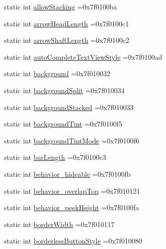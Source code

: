 \begin{DoxyCompactItemize}
\item 
static int \hyperlink{classandroid_1_1support_1_1v4_1_1R_1_1attr_ab166be6b5606db68828a302f162f8cd0}{allow\+Stacking} =0x7f0100ba
\item 
static int \hyperlink{classandroid_1_1support_1_1v4_1_1R_1_1attr_a2e623c2b4980c56bac06c3ec52a679e5}{arrow\+Head\+Length} =0x7f0100c1
\item 
static int \hyperlink{classandroid_1_1support_1_1v4_1_1R_1_1attr_a5b8710bfc0b35653f4f7cc097e377dfc}{arrow\+Shaft\+Length} =0x7f0100c2
\item 
static int \hyperlink{classandroid_1_1support_1_1v4_1_1R_1_1attr_a1431731a557fac44d41907daa49e4b8f}{auto\+Complete\+Text\+View\+Style} =0x7f0100ad
\item 
static int \hyperlink{classandroid_1_1support_1_1v4_1_1R_1_1attr_a3aa8b955b1ba13d9d418c7ac9c23b291}{background} =0x7f010032
\item 
static int \hyperlink{classandroid_1_1support_1_1v4_1_1R_1_1attr_accf7c5a5b1116cb065de3d8e2451c213}{background\+Split} =0x7f010034
\item 
static int \hyperlink{classandroid_1_1support_1_1v4_1_1R_1_1attr_af2fc746740dad6cfe275c2ff161399a6}{background\+Stacked} =0x7f010033
\item 
static int \hyperlink{classandroid_1_1support_1_1v4_1_1R_1_1attr_aee5568276e5effa7f9682abb574dbb69}{background\+Tint} =0x7f0100f5
\item 
static int \hyperlink{classandroid_1_1support_1_1v4_1_1R_1_1attr_a7169568146e422cf98009d4a36ee607c}{background\+Tint\+Mode} =0x7f0100f6
\item 
static int \hyperlink{classandroid_1_1support_1_1v4_1_1R_1_1attr_ad58969d24cd9bf6a2af3fdd44ca43dbf}{bar\+Length} =0x7f0100c3
\item 
static int \hyperlink{classandroid_1_1support_1_1v4_1_1R_1_1attr_a4743a5bd4c43bcfe955c9904fe16c93e}{behavior\+\_\+hideable} =0x7f0100fb
\item 
static int \hyperlink{classandroid_1_1support_1_1v4_1_1R_1_1attr_a9c99f83bd4153ed9af5740d4a4cf48dc}{behavior\+\_\+overlap\+Top} =0x7f010121
\item 
static int \hyperlink{classandroid_1_1support_1_1v4_1_1R_1_1attr_a410f0e475e0b8e5e57b221d907504857}{behavior\+\_\+peek\+Height} =0x7f0100fa
\item 
static int \hyperlink{classandroid_1_1support_1_1v4_1_1R_1_1attr_a05efc50b5af682c842a413b753b38a20}{border\+Width} =0x7f010117
\item 
static int \hyperlink{classandroid_1_1support_1_1v4_1_1R_1_1attr_a08415738186ce4d57592c16d5f7c423f}{borderless\+Button\+Style} =0x7f010080

\end{DoxyCompactItemize}
